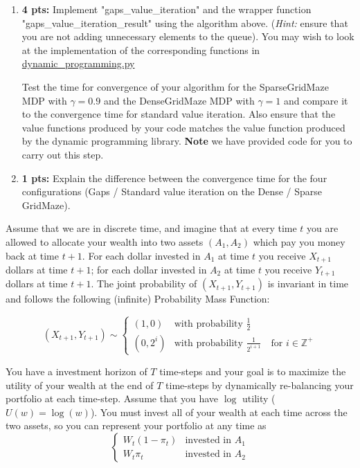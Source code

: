 \documentclass[12pt]{exam}
\begin{document}
\begin{questions}
\begin{enumerate}
    \item {\bf 4 pts:} Implement "gaps\_value\_iteration" and the wrapper function "gaps\_value\_iteration\_result" using the algorithm above. ({\em Hint:} ensure that you are not adding unnecessary elements to the queue). You may wish to look at the implementation of the corresponding functions in \href{https://github.com/TikhonJelvis/RL-book/blob/master/rl/dynamic_programming.py}{dynamic\_programming.py}
    
    Test the time for convergence of your algorithm for the SparseGridMaze MDP with $\gamma = 0.9$ and the DenseGridMaze MDP with $\gamma = 1$ and compare it to the convergence time for standard value iteration. Also ensure that the value functions produced by your code matches the value function produced by the dynamic programming library. {\bf Note} we have provided code for you to carry out this step.
    
    \item {\bf 1 pts:}  Explain the difference between the convergence time for the four configurations (Gaps / Standard value iteration on the Dense / Sparse GridMaze).
\end{enumerate}


\newpage{}
Assume that we are in discrete time, and imagine that at every time $t$ you are allowed to allocate your wealth into two assets $(A_1, A_2)$ which pay you money back at time $t+1$. For each dollar invested in $A_1$ at time $t$ you receive $X_{t+1}$ dollars at time $t+1$; for each dollar invested in $A_2$ at time $t$ you receive $Y_{t+1}$ dollars at time $t+1$. The joint probability of $(X_{t+1}, Y_{t+1})$ is invariant in time and follows the following (infinite) Probability Mass Function:

\[(X_{t+1}, Y_{t+1}) \sim \begin{cases}(1,0) &\text{with probability } \frac{1}{2}\\
(0, 2^i) &\text{with probability } \frac{1}{2^{i+1}} \quad \text{for } i\in \mathbb{Z}^+ \end{cases}\]

You have a investment horizon of $T$ time-steps and your goal is to maximize the utility of your wealth at the end of $T$ time-steps by dynamically re-balancing your portfolio at each time-step. Assume that you have $\log$ utility ($U(w) = \log(w)$). You must invest all of your wealth at each time across the two assets, so you can represent your portfolio at any time as 
\[\begin{cases} W_t(1-\pi_t) &\text{invested in } A_1\\ 
                    W_t \pi_t &\text{invested in }  A_2
\end{cases}\]


\end{questions}
\end{document}

